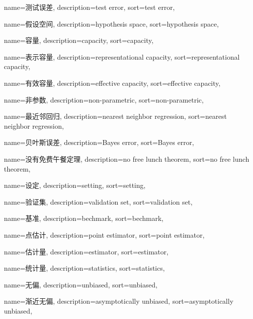 {
  name=测试误差,
  description={test error},
  sort={test error},
}

{
  name=假设空间,
  description={hypothesis space},
  sort={hypothesis space},
}

{
  name=容量,
  description={capacity},
  sort={capacity},
}

{
  name=表示容量,
  description={representational capacity},
  sort={representational capacity},
}

{
  name=有效容量,
  description={effective capacity},
  sort={effective capacity},
}

{
  name=非参数,
  description={non-parametric},
  sort={non-parametric},
}

{
  name=最近邻回归,
  description={nearest neighbor regression},
  sort={nearest neighbor regression},
}

{
  name=贝叶斯误差,
  description={Bayes error},
  sort={Bayes error},
}

{
  name=没有免费午餐定理,
  description={no free lunch theorem},
  sort={no free lunch theorem},
}

{
  name=设定,
  description={setting},
  sort={setting},
}

{
  name=验证集,
  description={validation set},
  sort={validation set},
}

{
  name=基准,
  description={bechmark},
  sort={bechmark},
}

{
  name=点估计,
  description={point estimator},
  sort={point estimator},
}

{
  name=估计量,
  description={estimator},
  sort={estimator},
}

{
  name=统计量,
  description={statistics},
  sort={statistics},
}

{
  name=无偏,
  description={unbiased},
  sort={unbiased},
}

{
  name=渐近无偏,
  description={asymptotically unbiased},
  sort={asymptotically unbiased},
}

